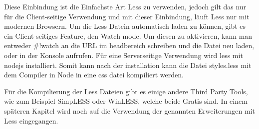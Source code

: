 Diese Einbindung ist die Einfachste Art Less zu verwenden, jedoch gilt das nur für die Client-seitige Verwendung und mit dieser Einbindung, läuft Less nur mit modernen Browsern.\newline
Um die Less Datein automatisch laden zu können, gibt es ein Client-seitiges Feature, den Watch mode. Um diesen zu aktivieren, kann man entweder \grqq\#!watch\glqq{} an die URL im headbereich schreiben und die Datei neu laden, oder in der Konsole \glqq{}   aufrufen.\newline
Für eine Serverseitige Verwendung wird less mit nodejs installiert. Somit kann nach der installation kann die Datei styles.less mit dem Compiler in Node in eine css datei kompiliert werden.\autocite[]{Sellier.2013}

Für die Kompilierung der Less Dateien gibt es einige andere Third Party Tools, wie zum Beispiel SimpLESS oder WinLESS, welche beide Gratis sind.\newline
In einem späteren Kapitel wird noch auf die Verwendung der genannten Erweiterungen mit Less eingegangen.
\newpage
